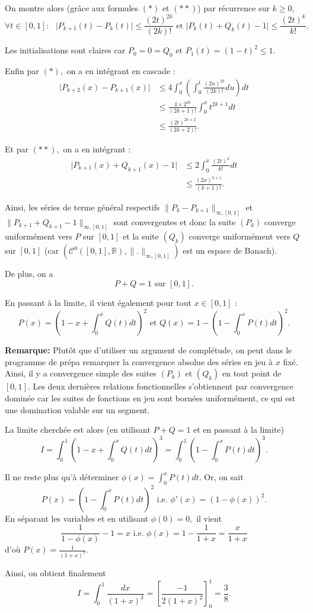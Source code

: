 On montre alors (grâce aux formules $(*)$ et $(**)$) par récurrence sur $k\geq 0,$ $$\forall t\in[0,1] :\mbox{ } \vert P_{k+1}(t)-P_{k}(t)\vert\leq \frac{(2t)^{2k}}{(2k)!}  \mbox{ et } \vert P_{k}(t)+Q_{k}(t)-1\vert \leq \frac{(2t)^{k}}{k!}.$$

Les initialisations sont claires car $\displaystyle P_{0}=0=Q_{0} \mbox{ et } P_{1}(t)=(1-t)^{2}\leq 1.$

Enfin par $(*),$ on a en intégrant en cascade :
\begin{align*}
\vert P_{k+2}(x)-P_{k+1}(x)\vert  & \leq 4\int_{0}^{x}\left(\int_{0}^{t}\frac{(2u)^{2k}}{(2k)!}du\right)dt\\
& \leq \frac{4\times 2^{2k}}{(2k+1)!}\int_{0}^{x}t^{2k+1}dt\\
& \leq \frac{(2t)^{2k+2}}{(2k+2)!}.
\end{align*}

Et par $(**),$ on a en intégrant :
\begin{align*}
\vert P_{k+1}(x)+Q_{k+1}(x)-1\vert & \leq 2\int_{0}^{x}\frac{(2t)^{k}}{k!}dt\\
& \leq \frac{(2x)^{k+1}}{(k+1)!}.
\end{align*}

Ainsi, les séries de terme général respectifs $\displaystyle \|P_{k}-P_{k+1}\|_{\infty,[0,1]}$ et  $\displaystyle \|P_{k+1}+Q_{k+1}-1\|_{\infty,[0,1]}$  sont convergentes et donc la suite $(P_{k})$ converge uniformément vers $P$ sur $[0,1]$ et la suite  $(Q_{k})$ converge uniformément vers $Q$ sur $[0,1]$ (car $\displaystyle \left(\mathcal{C}^{0}([0,1],\mathbb{R}),\|.\|_{\infty,[0,1]}\right)$ est un espace de Banach). 

De plus, on a $$ P+Q=1 \mbox{ sur } [0,1].$$

En passant à la limite, il vient également pour tout $x\in[0,1]$ : $$\displaystyle P(x)=\left(1-x+\int_{0}^{x}Q(t)dt\right)^{2} \mbox{ et } Q(x)=1-\left(1-\int_{0}^{x}P(t)dt\right)^{2}.$$

\textbf{Remarque: } Plutôt que d'utiliser un argument de complétude, on peut dans le programme de prépa remarquer la convergence absolue des séries en jeu à $x$ fixé. Ainsi, il y a convergence simple des suites $(P_{k})$ et $(Q_{k})$ en tout point de $[0,1].$ Les deux dernières relations fonctionnelles s'obtiennent par convergence dominée car les suites de fonctions en jeu sont bornées uniformément, ce qui est une domination valable sur un segment.

La limite cherchée est alors (en utilisant $P+Q=1$ et en passant à la limite) $$ I=\int_{0}^{1}\left(1-x+\int_{0}^{x}Q(t)dt\right)^{3}=\int_{0}^{1}\left(1-\int_{0}^{x}P(t)dt\right)^{3}.$$

Il ne reste plus qu'à déterminer $\displaystyle \phi(x)=\int_{0}^{x}P(t)dt.$
Or, on sait $$\displaystyle P(x)=\left(1-\int_{0}^{x}P(t)dt\right)^{2} \mbox{ i.e. } \phi'(x)=\left(1-\phi(x)\right)^{2}.$$
En séparant les variables et en utilisant $\phi(0)=0,$ il vient $$ \frac{1}{1-\phi(x)}-1=x \mbox{ i.e. } \phi(x)=1-\frac{1}{1+x}=\frac{x}{1+x}$$ d'où $\displaystyle P(x)=\frac{1}{(1+x)^{2}}.$

Ainsi, on obtient finalement $$ I=\int_{0}^{1}\frac{dx}{(1+x)^{3}}=\left[\frac{-1}{2(1+x)^{2}}\right]_{0}^{1}=\frac{3}{8}.$$